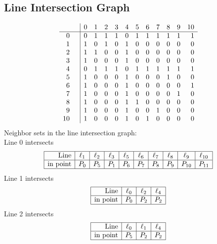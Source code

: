 \documentclass{article}
\begin{document}
{\subsection*{Line Intersection Graph}
{\arraycolsep=1pt
$$
\begin{array}{rr|*{11}r}
 &  & 0 & 1 & 2 & 3 & 4 & 5 & 6 & 7 & 8 & 9 & 10\\
\hline
0 &  & 0 & 1 & 1 & 1 & 0 & 1 & 1 & 1 & 1 & 1 & 1\\
1 &  & 1 & 0 & 1 & 0 & 1 & 0 & 0 & 0 & 0 & 0 & 0\\
2 &  & 1 & 1 & 0 & 0 & 1 & 0 & 0 & 0 & 0 & 0 & 0\\
3 &  & 1 & 0 & 0 & 0 & 1 & 0 & 0 & 0 & 0 & 0 & 0\\
4 &  & 0 & 1 & 1 & 1 & 0 & 1 & 1 & 1 & 1 & 1 & 1\\
5 &  & 1 & 0 & 0 & 0 & 1 & 0 & 0 & 0 & 1 & 0 & 0\\
6 &  & 1 & 0 & 0 & 0 & 1 & 0 & 0 & 0 & 0 & 0 & 1\\
7 &  & 1 & 0 & 0 & 0 & 1 & 0 & 0 & 0 & 0 & 1 & 0\\
8 &  & 1 & 0 & 0 & 0 & 1 & 1 & 0 & 0 & 0 & 0 & 0\\
9 &  & 1 & 0 & 0 & 0 & 1 & 0 & 0 & 1 & 0 & 0 & 0\\
10 &  & 1 & 0 & 0 & 0 & 1 & 0 & 1 & 0 & 0 & 0 & 0\\
\end{array}
$$
}%
Neighbor sets in the line intersection graph:\\
Line 0 intersects 
$$
\begin{array}{|r*{9}{|c}|}
\hline
\mbox{Line}  & \ell_{1} & \ell_{2} & \ell_{3} & \ell_{5} & \ell_{6} & \ell_{7} & \ell_{8} & \ell_{9} & \ell_{10}\\
\hline
\mbox{in point}  & P_{0} & P_{5} & P_{1} & P_{6} & P_{7} & P_{8} & P_{9} & P_{10} & P_{11}\\
\hline
\end{array}
$$
Line 1 intersects 
$$
\begin{array}{|r*{3}{|c}|}
\hline
\mbox{Line}  & \ell_{0} & \ell_{2} & \ell_{4}\\
\hline
\mbox{in point}  & P_{0} & P_{2} & P_{2}\\
\hline
\end{array}
$$
Line 2 intersects 
$$
\begin{array}{|r*{3}{|c}|}
\hline
\mbox{Line}  & \ell_{0} & \ell_{1} & \ell_{4}\\
\hline
\mbox{in point}  & P_{5} & P_{2} & P_{2}\\
\hline

\end{array}$$}
\end{document}

